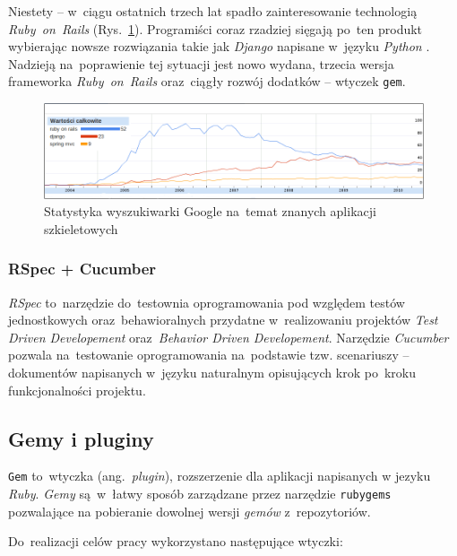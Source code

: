 Niestety -- w~ciągu ostatnich trzech lat spadło zainteresowanie technologią \textit{Ruby~on~Rails} (Rys.~\ref{fig.wykres.googleresearch}). Programiści coraz rzadziej sięgają po~ten produkt wybierając nowsze rozwiązania takie jak \textit{Django} \cite{django} napisane w~języku \textit{Python} \cite{python}. Nadzieją na~poprawienie tej sytuacji jest nowo wydana, trzecia wersja frameworka \textit{Ruby~on~Rails} oraz~ciągły rozwój dodatków -- wtyczek \texttt{gem}.

\begin{figure}[!t]
\centering
\includegraphics[width=\textwidth]{obrazki/googleresearch.png}
\caption[Statystyki Google na temat aplikacji szkieletowych]{Statystyka wyszukiwarki Google na~temat znanych aplikacji szkieletowych \cite{google.stats}}
\label{fig.wykres.googleresearch}
\end{figure}

\subsubsection{RSpec + Cucumber}

\textit{RSpec} \cite{rspec} to~narzędzie do~testownia oprogramowania pod względem testów jednostkowych oraz~behawioralnych przydatne w~realizowaniu projektów \textit{Test Driven Developement} oraz~\textit{Behavior Driven Developement}. Narzędzie \textit{Cucumber} \cite{cucumber} pozwala na~testowanie oprogramowania na~podstawie tzw. scenariuszy -- dokumentów napisanych w~języku naturalnym opisujących krok po~kroku funkcjonalności projektu.

\subsection{Gemy i pluginy} \label{technologie.gemy}

\texttt{Gem} to~wtyczka (ang.~\textit{plugin}), rozszerzenie dla aplikacji napisanych w jezyku \textit{Ruby}. \textit{Gemy} są~w~łatwy sposób zarządzane przez narzędzie \texttt{rubygems} pozwalające na pobieranie dowolnej wersji \textit{gemów} z~repozytoriów.


Do~realizacji celów pracy wykorzystano następujące wtyczki:

